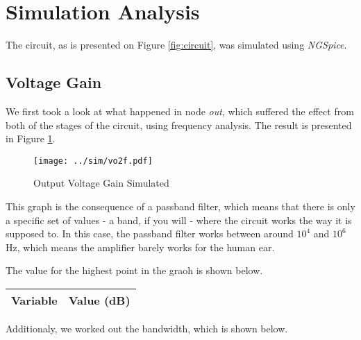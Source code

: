 \clearpage

\section{Simulation Analysis}
\label{sec:simulation}

The circuit, as is presented on Figure \ref{fig:circuit}, was simulated using \textit{NGSpice}.

\vspace{-0.2cm}

\subsection{Voltage Gain}

We first took a look at what happened in node \textit{out}, which suffered the effect from both of the stages of the circuit, using frequency analysis. The result is presented in Figure \ref{fig:vo2f}.

\vspace{-3cm}

\begin{figure}[h] \centering
\texttt{[image: ../sim/vo2f.pdf]}
\caption{Output Voltage Gain Simulated}
\label{fig:vo2f}
\end{figure}

This graph is the consequence of a passband filter, which means that there is only a specific set of values - a band, if you will - where the circuit works the way it is supposed to. In this case, the passband filter works between around $10^4$ and $10^6$ Hz, which means the amplifier barely works for the human ear.

The value for the highest point in the graoh is shown below.

\vspace{0.4cm}

\begin{center}
\begin{tabular}{|l|r|}
  \hline    
  {\bf Variable} & {\bf Value (dB)} \\ \hline
  
\end{tabular}
\end{center}

\vspace{0.4cm}


Additionaly, we worked out the bandwidth, which is shown below.

\vspace{0.4cm}

